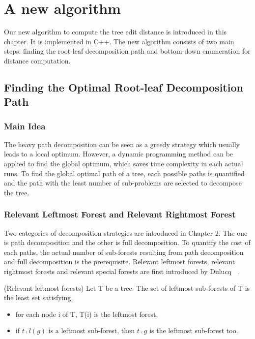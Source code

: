 \doublespacing
\allowdisplaybreaks
\chapter{A new algorithm}
Our new algorithm to compute the tree edit distance is introduced in this chapter. It is implemented in C++. The new algorithm consists of two main steps: finding the root-leaf decomposition path and bottom-down enumeration for distance computation.
\section{Finding the Optimal Root-leaf Decomposition Path}
\subsection{Main Idea}
The heavy path decomposition can be seen as a greedy strategy which usually leads to a local optimum. However, a dynamic programming method can be applied to find the global optimum, which saves time complexity in each actual runs. To find the global optimal path of a tree, each possible paths is quantified and the path with the least number of sub-problems are selected to decompose the tree.
\subsection{Relevant Leftmost Forest and Relevant Rightmost Forest}

Two categories of decomposition strategies are introduced in Chapter 2. The one is path decomposition and the other is full decomposition. To quantify the cost of each paths, the actual number of sub-forests resulting from path decomposition and full decomposition is the prerequisite. Relevant leftmost forests, relevant rightmost forests and relevant special forests are first introduced by Dulucq ~\cite{dulucq2005decomposition}.

\begin{definition}
(Relevant leftmost forests)
Let T be a tree. The set of leftmost sub-forests of T is the least set satisfying, 
\begin{itemize}
\item for each node i of T, T(i) is the leftmost forest,
\item if $t \comp l(g)$ is a leftmost sub-forest, then $t \comp g$ is the leftmost sub-forest too.
\end{itemize}
\end{definition}

